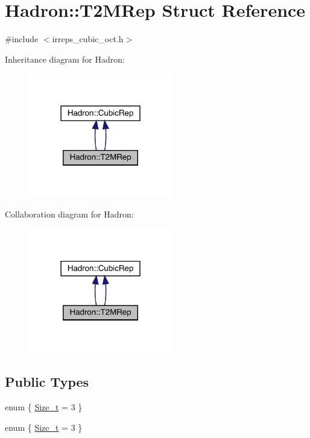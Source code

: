 \hypertarget{structHadron_1_1T2MRep}{}\section{Hadron\+:\+:T2\+M\+Rep Struct Reference}
\label{structHadron_1_1T2MRep}


{\ttfamily \#include $<$irreps\+\_\+cubic\+\_\+oct.\+h$>$}



Inheritance diagram for Hadron\+:\nopagebreak
\begin{figure}[H]
\begin{center}
\leavevmode
\includegraphics[width=178pt]{d8/d81/structHadron_1_1T2MRep__inherit__graph}
\end{center}
\end{figure}


Collaboration diagram for Hadron\+:\nopagebreak
\begin{figure}[H]
\begin{center}
\leavevmode
\includegraphics[width=178pt]{db/d62/structHadron_1_1T2MRep__coll__graph}
\end{center}
\end{figure}
\subsection*{Public Types}
\begin{DoxyCompactItemize}
\item 
enum \{ \mbox{\hyperlink{structHadron_1_1T2MRep_ae54ab133c50e92b5a400a822386d1e43a8c066d0d652b6dd6f011f24db92e8d34}{Size\+\_\+t}} = 3
 \}
\item 
enum \{ \mbox{\hyperlink{structHadron_1_1T2MRep_ae54ab133c50e92b5a400a822386d1e43a8c066d0d652b6dd6f011f24db92e8d34}{Size\+\_\+t}} = 3
 \}
\end{DoxyCompactItemize}
